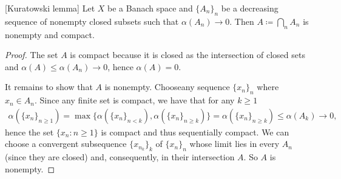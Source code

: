 \begin{theorem}\label{thm:noncompact_kuratowski_lemma}[Kuratowski lemma]\cite[exercise 7.4]{Deimling1985}
  Let \( X \) be a Banach space and \( \{ A_n \}_n \) be a decreasing sequence of nonempty closed subsets such that \( \alpha(A_n) \to 0 \). Then \( A \coloneqq \bigcap_n A_n \) is nonempty and compact.
\end{theorem}
\begin{proof}
  The set \( A \) is compact because it is closed as the intersection of closed sets and \( \alpha(A) \leq \alpha(A_n) \to 0 \), hence \( \alpha(A) = 0 \).

  It remains to show that \( A \) is nonempty.
  Choose\AOC any sequence \( \{ x_n \}_n \) where \( x_n \in A_n \). Since any finite set is compact, we have that for any \( k \geq 1 \)
  \begin{align*}
    \alpha(\{ x_n \}_{n \geq 1})
    =
    \max\{ \alpha(\{ x_n \}_{n < k}), \alpha(\{ x_n \}_{n \geq k}) \}
    =
    \alpha(\{ x_n \}_{n \geq k})
    \leq
    \alpha(A_k) \to 0,
  \end{align*}
  hence the set \( \{ x_n \colon n \geq 1 \} \) is compact and thus sequentially compact. We can choose a convergent subsequence \( \{ x_{n_k} \}_k \) of \( \{ x_n \}_n \) whose limit lies in every \( A_n \) (since they are closed) and, consequently, in their intersection \( A \). So \( A \) is nonempty.
\end{proof}
